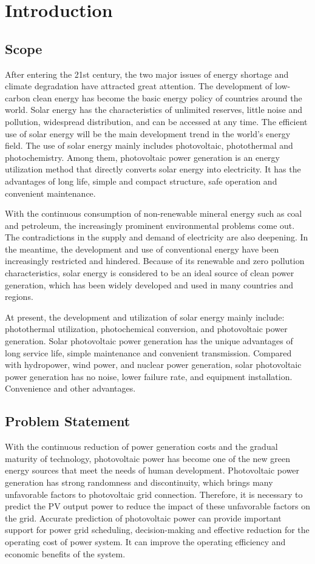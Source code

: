 
\chapter{Introduction}
\section{Scope}
After entering the 21st century, the two major issues of energy shortage and climate degradation have attracted great attention. The development of low-carbon clean energy has become the basic energy policy of countries around the world.\cite{wang2011path} Solar energy has the characteristics of unlimited reserves, little noise and pollution, widespread distribution, and can be accessed at any time. The efficient use of solar energy will be the main development trend in the world's energy field. The use of solar energy mainly includes photovoltaic, photothermal and photochemistry. Among them, photovoltaic power generation is an energy utilization method that directly converts solar energy into electricity. It has the advantages of long life, simple and compact structure, safe operation and convenient maintenance.

With the continuous consumption of non-renewable mineral energy such as coal and petroleum, the increasingly prominent environmental problems come out. The contradictions in the supply and demand of electricity are also deepening. In the meantime, the development and use of conventional energy have been increasingly restricted and hindered. Because of its renewable and zero pollution characteristics, solar energy is considered to be an ideal source of clean power generation, which has been widely developed and used in many countries and regions.

At present, the development and utilization of solar energy mainly include: photothermal utilization, photochemical conversion, and photovoltaic power generation. Solar photovoltaic power generation has the unique advantages of long service life, simple maintenance and convenient transmission. Compared with hydropower, wind power, and nuclear power generation, solar photovoltaic power generation has no noise, lower failure rate, and equipment installation. Convenience and other advantages.


\section{Problem Statement}
With the continuous reduction of power generation costs and the gradual maturity of technology, photovoltaic power has become one of the new green energy sources that meet the needs of human development. Photovoltaic power generation has strong randomness and discontinuity, which brings many unfavorable factors to photovoltaic grid connection.\cite{li2016multi} Therefore, it is necessary to predict the PV output power to reduce the impact of these unfavorable factors on the grid. Accurate prediction of photovoltaic power can provide important support for power grid scheduling, decision-making and effective reduction for the operating cost of power system.\cite{wan2015photovoltaic} It can improve the operating efficiency and economic benefits of the system.


